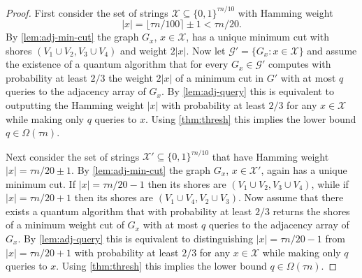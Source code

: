 \documentclass[10pt,a4paper]{article}
\newcommand{\Gcal}{\mathcal{G}}
\newcommand{\Xcal}{\mathcal{X}}
\newcommand{\1}{\mathbf{1}}
\theoremstyle{definition}
\begin{document}
\begin{proof}
First consider the set of strings $\Xcal \subseteq \{0,1\}^{\tau n/10}$ with Hamming weight
\[
|x|
= \lfloor \tau n/100 \rceil \pm 1
< \tau n/20.
\]
By \cref{lem:adj-min-cut} the graph $G_x$, $x \in \Xcal$, has a unique minimum cut with shores $(V_1 \cup V_2, V_3 \cup V_4)$ and weight $2|x|$.
Now let $\Gcal' = \{G_x : x \in \Xcal\}$ and assume the existence of a quantum algorithm that for every $G_x \in \Gcal'$ computes with probability at least $2/3$ the weight $2|x|$ of a minimum cut in $G'$ with at most $q$ queries to the adjacency array of $G_x$.
By \cref{lem:adj-query} this is equivalent to outputting the Hamming weight $|x|$ with probability at least $2/3$ for any $x \in \Xcal$ while making only $q$ queries to $x$.
Using \cref{thm:thresh} this implies the lower bound $q \in \Omega(\tau n)$.

Next consider the set of strings $\Xcal' \subseteq \{0,1\}^{\tau n/10}$ that have Hamming weight $|x| = \tau n/20 \pm 1$.
By \cref{lem:adj-min-cut} the graph $G_x$, $x \in \Xcal'$, again has a unique minimum cut.
If $|x| = \tau n/20 - 1$ then its shores are $(V_1 \cup V_2, V_3 \cup V_4)$, while if $|x| = \tau n/20 + 1$ then its shores are $(V_1 \cup V_4, V_2 \cup V_3)$.
Now assume that there exists a quantum algorithm that with probability at least $2/3$ returns the shores of a minimum weight cut of $G_x$ with at most $q$ queries to the adjacency array of $G_x$.
By \cref{lem:adj-query} this is equivalent to distinguishing $|x| = \tau n/20 - 1$ from $|x| = \tau n/20 + 1$ with probability at least $2/3$ for any $x \in \Xcal$ while making only $q$ queries to $x$.
Using \cref{thm:thresh} this implies the lower bound $q \in \Omega(\tau n)$.
\end{proof}
\end{document}
